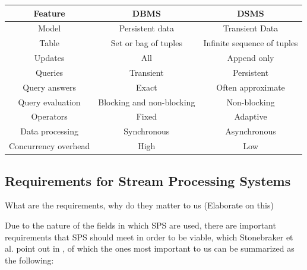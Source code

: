         \begin{table}[h]
            \centering
            \label{tab:dbms-dsms}
            \begin{tabular}{|c|c|c|} \hline
                \textbf{Feature} & \textbf{DBMS} & \textbf{DSMS} \\ \hline
                Model & Persistent data & Transient Data \\ \hline
                Table & Set or bag of tuples & Infinite sequence of tuples \\ \hline
                Updates & All & Append only \\ \hline
                Queries & Transient & Persistent \\ \hline
                Query answers & Exact & Often approximate \\ \hline
                Query evaluation & Blocking and non-blocking & Non-blocking \\ \hline
                Operators & Fixed & Adaptive \\ \hline
                Data processing & Synchronous & Asynchronous \\ \hline
                Concurrency overhead  & High & Low \\ \hline
            \end{tabular}
        \end{table}

        \subsection{Requirements for Stream Processing Systems}
        What are the requirements, why do they matter to us (Elaborate on this)

        Due to the nature of the fields in which SPS are used, there are important requirements that SPS should meet in order to be viable, 
        which Stonebraker et al. point out in \cite{Stonebraker:2005:RRS:1107499.1107504}, of which the ones most important to us can be summarized as the following:
        
